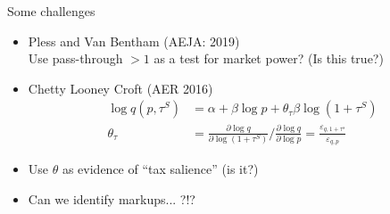 \begin{frame}{Some challenges}
\begin{itemize}
\item Pless and Van Bentham (AEJA: 2019)\\
 Use pass-through $>1$ as a test for market power? (Is this true?)
\item Chetty Looney Croft (AER 2016)
\begin{align*}
\log q\left(p, \tau^S\right)&=\alpha+\beta \log p+\theta_\tau \beta \log \left(1+\tau^S\right)\\
\theta_\tau&=\frac{\partial \log q}{\partial \log \left(1+\tau^S\right)} / \frac{\partial \log q}{\partial \log p}=\frac{\varepsilon_{q, 1+\tau^s}}{\varepsilon_{q, p}}
\end{align*}
\item Use $\theta$ as evidence of ``tax salience'' (is it?)
\item Can we identify markups... ?!?
\end{itemize}
\end{frame}




